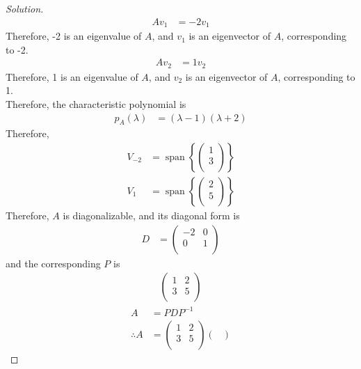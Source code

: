 \documentclass[fleqn, a4paper, 12pt]{article}
\theoremstyle{definition}
\theoremstyle{theorem}
\newenvironment{solution}
{\begin{proof}[Solution]\let\qed\relax}
	{\end{proof}}
\DeclareMathOperator{\vspan}{\mathrm{span}} %
\begin{document}
\begin{solution}
	\begin{align*}
		A v_1 &= -2 v_1
	\end{align*}
	Therefore, -2 is an eigenvalue of $A$, and $v_1$ is an eigenvector of $A$, corresponding to -2.
	\begin{align*}
		A v_2 &= 1 v_2
	\end{align*}
	Therefore, 1 is an eigenvalue of $A$, and $v_2$ is an eigenvector of $A$, corresponding to 1.\\
	Therefore, the characteristic polynomial is
	\begin{align*}
		p_A (\lambda) &= (\lambda - 1) (\lambda + 2)
	\end{align*}
	Therefore,
	\begin{align*}
		V_{-2} &= \vspan
			\left\lbrace
				\begin{pmatrix}
					1\\
					3\\
				\end{pmatrix}
			\right\rbrace\\
		V_{1} &= \vspan
			\left\lbrace
				\begin{pmatrix}
					2\\
					5\\
				\end{pmatrix}
			\right\rbrace
	\end{align*}
	Therefore, $A$ is diagonalizable, and its diagonal form is
	\begin{align*}
		D &= 
			\begin{pmatrix}
				-2 & 0\\
				0 & 1\\
			\end{pmatrix}
	\end{align*}
	and the corresponding $P$ is
	\begin{align*}
		\begin{pmatrix}
			1 & 2\\
			3 & 5\\
		\end{pmatrix}
	\end{align*}
	\begin{align*}
		A &= P D P^{-1}\\
		\therefore A &= 
			\begin{pmatrix}
				1 & 2\\
				3 & 5\\
			\end{pmatrix}
			\begin{pmatrix}

\end{pmatrix}
\end{align*}
\end{solution}
\end{document}
